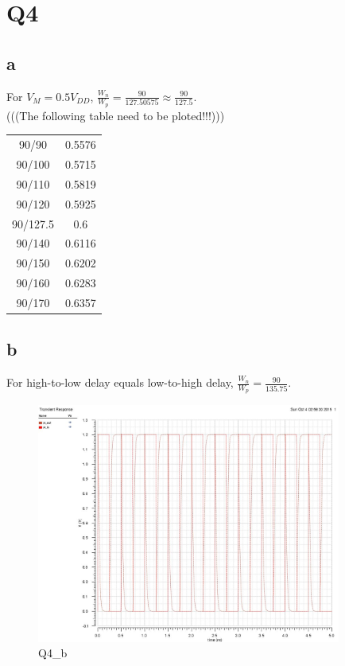 \documentclass[a4paper,10pt]{article}
\begin{document}
\section*{Q4}
\subsection*{a}
For \begin{math}V_{M} = 0.5V_{DD}\end{math}, \begin{math}\frac{W_n}{W_p} = \frac{90}{127.50575} \approx \frac{90}{127.5}\end{math}.\\
(((The following table need to be ploted!!!)))\\
\begin{tabular}{c|c}
 90/90	&	0.5576\\
 90/100	&	0.5715\\
 90/110	&	0.5819\\
 90/120	&	0.5925\\
 90/127.5	&	0.6\\
 90/140	&	0.6116\\
 90/150	&	0.6202\\
 90/160	&	0.6283\\
 90/170	&	0.6357\\
\end{tabular}
\subsection*{b}
For high-to-low delay equals low-to-high delay, \begin{math}\frac{W_n}{W_p} = \frac{90}{135.75}\end{math}.\\
\begin{figure}
 \centering
 \includegraphics[width=10cm]{Q4_b.jpg}
 \caption{Q4\_b}
\end{figure}
\end{document}

